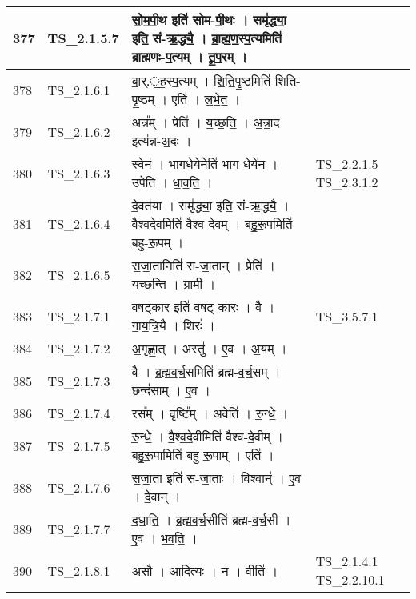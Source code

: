 \documentclass[17pt]{extarticle}
\begin{document}
\begin{longtable}{||p{0.4in}||p{0.9in}||p{4.0in}||p{0.9in}||}
        \hline
            377 & TS\_2.1.5.7 & सो॒म॒पी॒थ इति॑ सोम{-}पी॒थः   ।   समृ॑द्ध्या॒ इति॒ सं{-}ऋ॒द्ध्यै॒   ।   ब्रा॒ह्म॒ण॒स्प॒त्यमिति॑ ब्राह्मणः{-}प॒त्यम्   ।   तू॒प॒रम्   ।    &      \\
        \hline
            378 & TS\_2.1.6.1 & बा॒र्.॒ह॒स्प॒त्यम्   ।   शि॒ति॒पृ॒ष्ठमिति॑ शिति{-}पृ॒ष्ठम्   ।   एति॑   ।   ल॒भे॒त॒   ।    &      \\
        \hline
            379 & TS\_2.1.6.2 & अन्न᳚म्   ।   प्रेति॑   ।   य॒च्छ॒ति॒   ।   अ॒न्ना॒द इत्य॑न्न{-}अ॒दः   ।    &      \\
        \hline
            380 & TS\_2.1.6.3 & स्वेन॑   ।   भा॒ग॒धेये॒नेति॑ भाग{-}धेये॑न   ।   उपेति॑   ।   धा॒व॒ति॒   ।    &  TS\_2.2.1.5 TS\_2.3.1.2       \\
        \hline
            381 & TS\_2.1.6.4 & दे॒वत॑या   ।   समृ॑द्ध्या॒ इति॒ सं{-}ऋ॒द्ध्यै॒   ।   वै॒श्व॒दे॒वमिति॑ वैश्व{-}दे॒वम्   ।   ब॒हु॒रू॒पमिति॑ बहु{-}रू॒पम्   ।    &      \\
        \hline
            382 & TS\_2.1.6.5 & स॒जा॒तानिति॑ स{-}जा॒तान्   ।   प्रेति॑   ।   य॒च्छ॒न्ति॒   ।   ग्रा॒मी   ।    &      \\
        \hline
            383 & TS\_2.1.7.1 & व॒ष॒ट्का॒र इति॑ वषट्{-}का॒रः   ।   वै   ।   गा॒य॒त्रि॒यै   ।   शिरः॑   ।    &  TS\_3.5.7.1       \\
        \hline
            384 & TS\_2.1.7.2 & अ॒गृ॒ह्णा॒त्   ।   अस्तु॑   ।   ए॒व   ।   अ॒यम्   ।    &      \\
        \hline
            385 & TS\_2.1.7.3 & वै   ।   ब्र॒ह्म॒व॒र्च॒समिति॑ ब्रह्म{-}व॒र्च॒सम्   ।   छन्द॑साम्   ।   ए॒व   ।    &      \\
        \hline
            386 & TS\_2.1.7.4 & रस᳚म्   ।   वृष्टि᳚म्   ।   अवेति॑   ।   रु॒न्धे॒   ।    &      \\
        \hline
            387 & TS\_2.1.7.5 & रु॒न्धे॒   ।   वै॒श्व॒दे॒वीमिति॑ वैश्व{-}दे॒वीम्   ।   ब॒हु॒रू॒पामिति॑ बहु{-}रू॒पाम्   ।   एति॑   ।    &      \\
        \hline
            388 & TS\_2.1.7.6 & स॒जा॒ता इति॑ स{-}जा॒ताः   ।   विश्वान्॑   ।   ए॒व   ।   दे॒वान्   ।    &      \\
        \hline
            389 & TS\_2.1.7.7 & द॒धा॒ति॒   ।   ब्र॒ह्म॒व॒र्च॒सीति॑ ब्रह्म{-}व॒र्च॒सी   ।   ए॒व   ।   भ॒व॒ति॒   ।    &      \\
        \hline
            390 & TS\_2.1.8.1 & अ॒सौ   ।   आ॒दि॒त्यः   ।   न   ।   वीति॑   ।    & TS\_2.1.4.1  TS\_2.2.10.1       \\
        \hline

\end{longtable}
\end{document}
